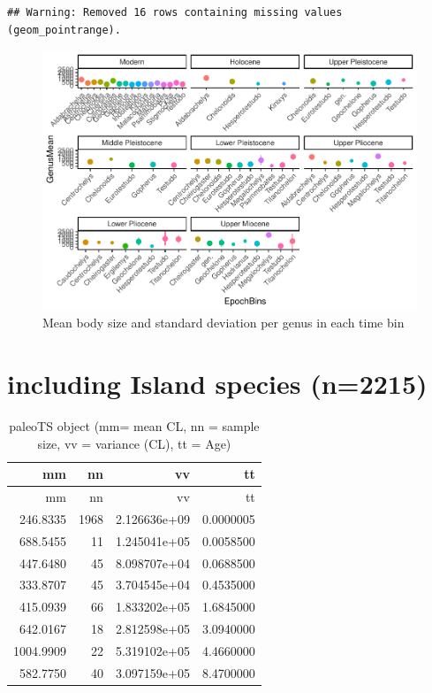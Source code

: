 \documentclass[]{article}
\begin{document}
\begin{verbatim}
## Warning: Removed 16 rows containing missing values (geom_pointrange).
\end{verbatim}

\begin{figure}[htbp]
\centering
\includegraphics{MA_JJ_files/figure-latex/Separate genera per time bin-1.pdf}
\caption{Mean body size and standard deviation per genus in each time
bin}
\end{figure}

\newpage

\section{including Island species
(n=2215)}\label{including-island-species-n2215}

\begin{longtable}[]{@{}rrrr@{}}
\caption{paleoTS object (mm= mean CL, nn = sample size, vv = variance
(CL), tt = Age)}\tabularnewline
\toprule
mm & nn & vv & tt\tabularnewline
\midrule
\endfirsthead
\toprule
mm & nn & vv & tt\tabularnewline
\midrule
\endhead
246.8335 & 1968 & 2.126636e+09 & 0.0000005\tabularnewline
688.5455 & 11 & 1.245041e+05 & 0.0058500\tabularnewline
447.6480 & 45 & 8.098707e+04 & 0.0688500\tabularnewline
333.8707 & 45 & 3.704545e+04 & 0.4535000\tabularnewline
415.0939 & 66 & 1.833202e+05 & 1.6845000\tabularnewline
642.0167 & 18 & 2.812598e+05 & 3.0940000\tabularnewline
1004.9909 & 22 & 5.319102e+05 & 4.4660000\tabularnewline
582.7750 & 40 & 3.097159e+05 & 8.4700000\tabularnewline
\bottomrule
\end{longtable}
\end{document}
